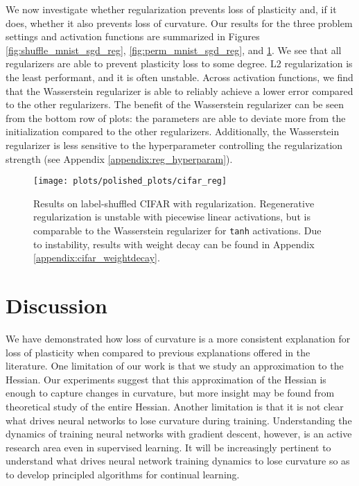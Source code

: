 \documentclass{article}
\begin{document}
We now investigate whether regularization prevents loss of plasticity and, if it does, whether it also prevents loss of curvature.
Our results for the three problem settings and activation functions are summarized in Figures \ref{fig:shuffle_mnist_sgd_reg}, \ref{fig:perm_mnist_sgd_reg}, and \ref{fig:cifar_reg}.
We see that all regularizers are able to prevent plasticity loss to some degree.
L2 regularization is the least performant, and it is often unstable.
Across activation functions, we find that the Wasserstein regularizer is able to reliably achieve a lower error compared to the other regularizers.
The benefit of the Wasserstein regularizer can be seen from the bottom row of plots: the parameters are able to deviate more from the initialization compared to the other regularizers.
Additionally, the Wasserstein regularizer is less sensitive to the hyperparameter controlling the regularization strength (see Appendix \ref{appendix:reg_hyperparam}).


\begin{figure}[h!]
  \centering
  \texttt{[image: plots/polished\_plots/cifar\_reg]}
\caption{Results on label-shuffled CIFAR with regularization. Regenerative regularization is unstable with piecewise linear activations, but is comparable to the Wasserstein regularizer for \texttt{tanh} activations. Due to instability, results with weight decay can be found in Appendix \ref{appendix:cifar_weightdecay}.}
  \label{fig:cifar_reg}
\end{figure}

\section{Discussion}

We have demonstrated how loss of curvature is a more consistent explanation for loss of plasticity when compared to previous explanations offered in the literature.
One limitation of our work is that we study an approximation to the Hessian.
Our experiments suggest that this approximation of the Hessian is enough to capture changes in curvature, but more insight may be found from theoretical study of the entire Hessian.
Another limitation is that it is not clear what drives neural networks to lose curvature during training.
Understanding the dynamics of training neural networks with gradient descent, however, is an active research area even in supervised learning.
It will be increasingly pertinent to understand what drives neural network training dynamics to lose curvature so as to develop principled algorithms for continual learning.
\end{document}
